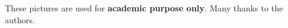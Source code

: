 \documentclass{article}
\begin{document}
\noindent These pictures are used for \textbf{academic purpose only}. Many thanks to the authors.

\newpage


\end{document}
